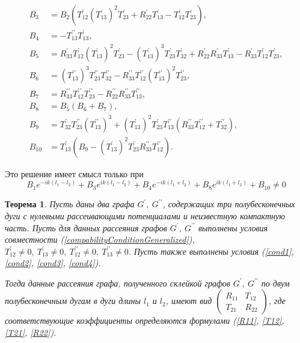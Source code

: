 \documentclass[a4 paper, 12 pt]{extarticle}
\newtheorem{theorem}{Теорема}[section]
\begin{document}
\[\begin{aligned}
   B_3 &= B_2 \left(T_{12}^\prime (T_{13}^\prime)^2 T_{23}^\prime + R_{22}^\prime T_{13}^\prime - T_{12}^\prime T_{23}^\prime\right),\\
   B_4 &= -T_{13}^{\prime\prime} T_{13}^\prime,\\
   B_5 &= R_{33}^\prime T_{12}^\prime (T_{13}^\prime)^2 T_{23}^\prime - (T_{13}^\prime)^3 T_{23}^\prime T_{32}^\prime + R_{22}^\prime R_{33}^\prime T_{13}^\prime - R_{33}^\prime T_{12}^\prime T_{23}^\prime,\\
   B_6 &= (T_{13}^{\prime\prime})^3 T_{23}^{\prime\prime} T_{32}^{\prime\prime} - R_{33}^{\prime\prime} T_{12}^{\prime\prime} (T_{13}^{\prime\prime})^2 T_{23}^{\prime\prime}, \\
   B_7 &= R_{33}^{\prime\prime} T_{12}^{\prime\prime} T_{23}^{\prime\prime} - R_{22}^{\prime\prime} R_{33}^{\prime\prime} T_{13}^{\prime\prime},\\
   B_8 &= B_5 \left(B_6 + B_7\right),\\
   B_9 &= T_{32}^\prime T_{23}^{\prime\prime} (T_{13}^{\prime\prime})^3 + (T_{13}^\prime)^2 T_{23}^\prime T_{13}^{\prime\prime} \left(R_{33}^{\prime\prime} T_{12}^{\prime\prime} + T_{32}^{\prime\prime}\right),\\
   B_{10} &= T_{13}^\prime\left(B_9 - (T_{13}^\prime)^2 T_{23}^\prime R_{33}^{\prime\prime} T_{12}^{\prime\prime}\right).
   \end{aligned}\]
   
   Это решение имеет смысл только при 
   \begin{equation}
   \label{cond4}
   {B_1 e^{-ik\left(l_1-l_2\right)} + B_3 e^{ik\left(l_1-l_2\right)} + B_4 e^{-ik\left(l_1+l_2\right)} + B_8 e^{ik\left(l_1+l_2\right)} + B_{10}} \neq 0
   \end{equation}
   
   \begin{theorem}
   	Пусть даны два графа $G^\prime, \ G^{\prime\prime}$, содержащих три полубесконечных дуги с нулевыми рассеивающими потенциалами и неизвестную компактную часть. Пусть для данных рассеяния графов  $G^\prime, \ G^{\prime\prime}$ выполнены условия совместности (\ref{compabilityConditionGeneralized}), $T_{12}^\prime \neq 0, \ T_{13}^\prime \neq 0, \ T_{12}^{\prime\prime} \neq 0, \ T_{13}^{\prime \prime} \neq 0$. Пусть также выполнены условия (\ref{cond1}, \ref{cond2}, \ref{cond3}, \ref{cond4}).
   	
   	Тогда данные рассеяния графа, полученного склейкой графов $G^\prime, \ G^{\prime\prime}$ по двум полубесконечным дугам в дуги длины $l_1$ и $l_2$, имеют вид $\left(\begin{matrix}
   	R_{11} & T_{12} \\
   	T_{21} & R_{22}
   	\end{matrix}\right)$, где соответствующие коэффициенты определяются формулами (\ref{R11}, \ref{T12}, \ref{T21}, \ref{R22}).
   \end{theorem}
   
\end{document}
